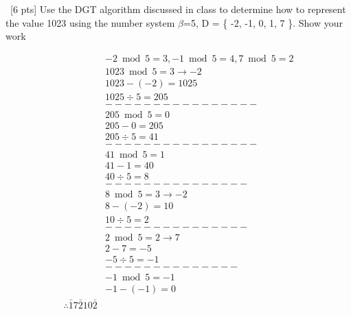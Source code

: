 \documentclass[12pt]{article}
\newenvironment{sol}[1][Solution]{\begin{trivlist}\item[\hskip\labelsep {\bfseries #1:}]}{\end{trivlist}}
\begin{document}
\begin{enumerate}
    \item \ [6 pts] Use the DGT algorithm discussed in class to determine how to represent the value 1023 using the number system $\beta$=5, D = \{ -2, -1, 0, 1, 7 \}. Show your work
    \begin{sol}
        \begin{align*}
        & -2 \bmod 5 = 3, -1 \bmod 5 = 4, 7 \bmod 5 = 2 \\
        & 1023 \bmod 5 = 3 \rightarrow -2 \\
        & 1023 - (-2) = 1025 \\
        & 1025 \div 5 = 205\\
        & ----------------\\
        & 205 \bmod 5 = 0 \\
        & 205 - 0 = 205\\
        & 205 \div 5 = 41\\
        & ----------------\\
        & 41 \bmod 5 = 1\\
        & 41 - 1 = 40\\
        & 40 \div 5 = 8\\
        & ---------------\\
        & 8 \bmod 5 = 3 \rightarrow -2\\
        & 8 -(-2) = 10\\
        & 10 \div 5 = 2 \\
        & ---------------\\
        & 2 \bmod 5 = 2 \rightarrow 7\\
        & 2 - 7 = -5 \\
        & -5 \div 5 = -1\\
        & --------------\\
        & -1 \bmod 5  =  -1\\
        & -1-(- 1) = 0\\
        \therefore \bar{1}7\bar{2}10\bar{2}
        \end{align*}
    \end{sol}


\end{enumerate}
\end{document}
